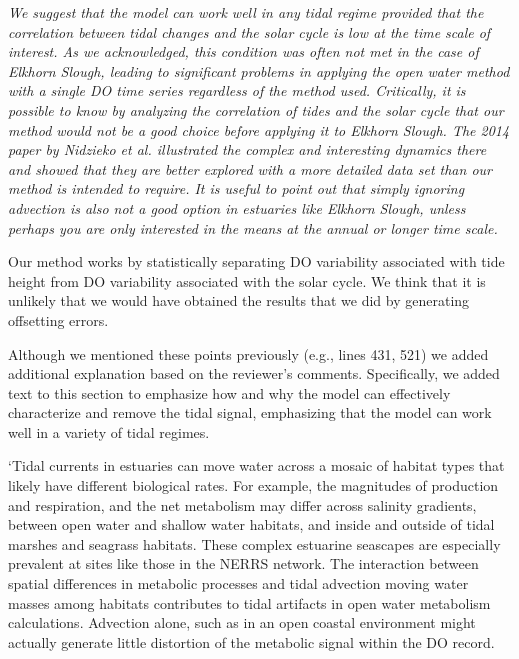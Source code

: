 \documentclass[letterpaper,12pt]{article}\usepackage[]{graphicx}\usepackage[]{color}
\begin{document}
{\it We suggest that the model can work well in any tidal regime provided that the correlation between tidal changes and the solar cycle is low at the time scale of interest.  As we acknowledged, this condition was often not met in the case of Elkhorn Slough, leading to significant problems in applying the open water method with a single DO time series regardless of the method used.  Critically, it is possible to know by analyzing the correlation of tides and the solar cycle that our method would not be a good choice before applying it to Elkhorn Slough.  The 2014 paper by Nidzieko et al. illustrated the complex and interesting dynamics there and showed that they are better explored with a more detailed data set than our method is intended to require.  It is useful to point out that simply ignoring advection is also not a good option in estuaries like Elkhorn Slough, unless perhaps you are only interested in the means at the annual or longer time scale.

Our method works by statistically separating DO variability associated with tide height from DO variability associated with the solar cycle.  We think that it is unlikely that we would have obtained the results that we did by generating offsetting errors.

Although we mentioned these points previously (e.g., lines 431, 521) we added additional explanation based on the reviewer’s comments. Specifically, we added text to this section to emphasize how and why the model can effectively characterize and remove the tidal signal, emphasizing that the model can work well in a variety of tidal regimes.

`Tidal currents in estuaries can move water across a mosaic of habitat types that likely have different biological rates.  For example, the magnitudes of production and respiration, and the net metabolism may differ across salinity gradients, between open water and shallow water habitats, and inside and outside of tidal marshes and seagrass habitats.  These complex estuarine seascapes are especially prevalent at sites like those in the NERRS network.  The interaction between spatial differences in metabolic processes and tidal advection moving water masses among habitats contributes to tidal artifacts in open water metabolism calculations.  Advection alone, such as in an open coastal environment might actually generate little distortion of the metabolic signal within the DO record.  

}
\end{document}
